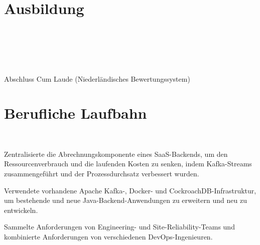 \documentclass[]{deedy-resume-openfont}
\begin{document}
    
%
%


%
%

\section{Ausbildung}
\raggedright

\\ \\
    
\sectionsep

\\ \\
Abschluss Cum Laude (Niederländisches Bewertungssystem)\\

\sectionsep


%
%
\section{Berufliche Laufbahn}

\\ 
\begin{tightemize}
	\item Zentralisierte die Abrechnungskomponente eines SaaS-Backends, um den Ressourcenverbrauch und die laufenden Kosten zu senken, indem Kafka-Streams zusammengeführt und der Prozessdurchsatz verbessert wurden.
	\item Verwendete vorhandene Apache Kafka-, Docker- und CockroachDB-Infrastruktur, um bestehende und neue Java-Backend-Anwendungen zu erweitern und neu zu entwickeln.
	\item Sammelte Anforderungen von Engineering- und Site-Reliability-Teams und kombinierte Anforderungen von verschiedenen DevOps-Ingenieuren.
\end{tightemize}
\end{document}
